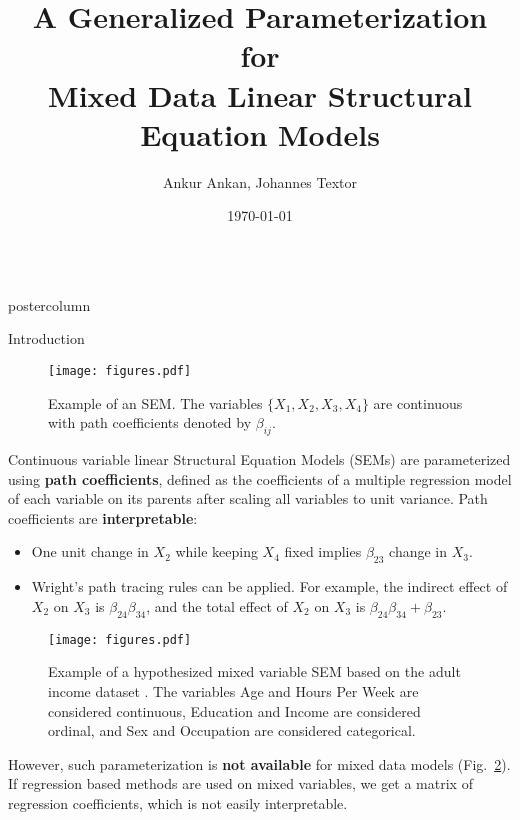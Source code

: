\documentclass{beamer}
\title{\huge A Generalized Parameterization for \\ Mixed Data Linear Structural Equation Models}
\author{Ankur Ankan, Johannes Textor}
\institute[RU]{Institute for Computing and Information Sciences \\ Radboud University, Netherlands}
\date{\today}
\newlength{\columnheight}
\begin{document}
\begin{frame}
\begin{columns}
	\begin{column}{.33\textwidth}
		\begin{beamercolorbox}[center]{postercolumn}
			\begin{minipage}{.98\textwidth}  %
				\parbox[t][\columnheight]{\textwidth}{ %
	\begin{myblock}{Introduction}
		\begin{figure}
			\texttt{[image: figures.pdf]}
			\caption{Example of an SEM. The variables $ \{ X_1, X_2, X_3, X_4 \} $ are continuous with path coefficients denoted by $ \beta_{ij} $.}
			\label{fig:example_sem}
		\end{figure}

		\vspace{1em}
		
		Continuous variable linear Structural Equation Models (SEMs)
		are parameterized using \textbf{path coefficients}, defined as
		the coefficients of a multiple regression model of each
		variable on its parents after scaling all variables to unit
		variance. Path coefficients are \textbf{interpretable}:
		\begin{itemize}
			\item One unit change in $ X_2 $ while keeping $ X_4 $ fixed implies $ \beta_{23} $ change in $ X_3 $. 
			\item Wright's path tracing rules \citep{Wright1934}
				can be applied. For example, the indirect
				effect of $ X_2 $ on $ X_3 $ is $ \beta_{24}
				\beta_{34} $, and the total effect of $ X_2 $ on
				$ X_3 $ is $ \beta_{24} \beta_{34} + \beta_{23}
				$.
		\end{itemize}

		\begin{figure}
			\texttt{[image: figures.pdf]}
			\caption{Example of a hypothesized mixed variable SEM
				based on the adult income dataset
				\citep{kohavi1996}. The variables Age and Hours
				Per Week are considered continuous, Education
				and Income are considered ordinal, and Sex and
				Occupation are considered categorical.}
			\label{fig:example_adult}
		\end{figure}

		\vspace{0.5em}

		However, such parameterization is \textbf{not available} for
		mixed data models (Fig.~\ref{fig:example_adult}). If regression
		based methods are used on mixed variables, we get a matrix of
		regression coefficients, which is not easily interpretable.


\end{myblock}}
\end{minipage}
\end{beamercolorbox}
\end{column}
\end{columns}
\end{frame}
\end{document}
